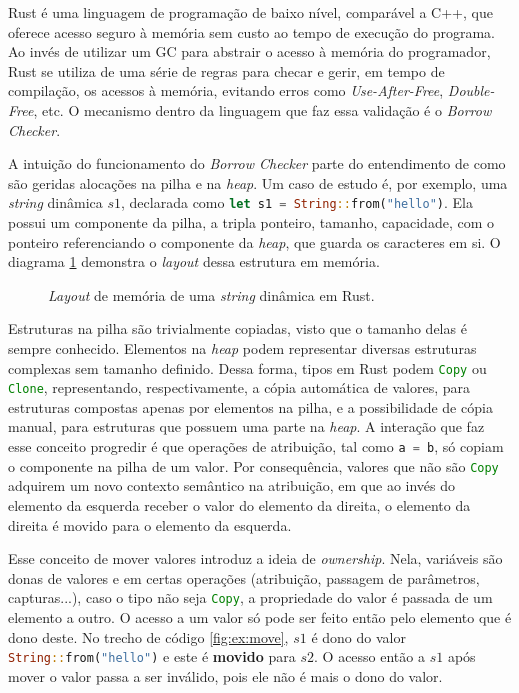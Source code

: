 Rust é uma linguagem de programação de baixo nível, comparável a C++, que oferece acesso seguro à memória sem custo ao tempo de execução do programa. Ao invés de utilizar um GC para abstrair o acesso à memória do programador, Rust se utiliza de uma série de regras para checar e gerir, em tempo de compilação, os acessos à memória, evitando erros como \emph{Use-After-Free}, \emph{Double-Free}, etc. O mecanismo dentro da linguagem que faz essa validação é o \emph{Borrow Checker}. 

A intuição do funcionamento do \emph{Borrow Checker} parte do entendimento de como são geridas alocações na pilha e na \emph{heap}. Um caso de estudo é, por exemplo, uma \emph{string} dinâmica $s1$, declarada como \lstinline[language=Rust]|let s1 = String::from("hello")|. Ela possui um componente da pilha, a tripla ponteiro, tamanho, capacidade, com o ponteiro referenciando o componente da \emph{heap}, que guarda os caracteres em si. O diagrama \ref{fig:svg:mem-layout} demonstra o \emph{layout} dessa estrutura em memória.

\begin{figure}[ht]
	\centering
	\caption{\emph{Layout} de memória de uma \emph{string} dinâmica em Rust.}
	\label{fig:svg:mem-layout}
	
\end{figure}

Estruturas na pilha são trivialmente copiadas, visto que o tamanho delas é sempre conhecido. Elementos na \emph{heap} podem representar diversas estruturas complexas sem tamanho definido.  Dessa forma, tipos em Rust podem \lstinline[language=Rust]|Copy| ou \lstinline[language=Rust]|Clone|, representando, respectivamente, a cópia automática de valores, para estruturas compostas apenas por elementos na pilha, e a possibilidade de cópia manual, para estruturas que possuem uma parte na \emph{heap}. A interação que faz esse conceito progredir é que operações de atribuição, tal como \lstinline[language=Rust]|a = b|, só copiam o componente na pilha de um valor. Por consequência, valores que não são \lstinline[language=Rust]|Copy| adquirem um novo contexto semântico na atribuição, em que ao invés do elemento da esquerda receber o valor do elemento da direita, o elemento da direita é movido para o elemento da esquerda. 

Esse conceito de mover valores introduz a ideia de \emph{ownership}. Nela, variáveis são donas de valores e em certas operações (atribuição, passagem de parâmetros, capturas...), caso o tipo não seja \lstinline[language=Rust]|Copy|, a propriedade do valor é passada de um elemento a outro. O acesso a um valor só pode ser feito então pelo elemento que é dono deste. No trecho de código \ref{fig:ex:move}, $s1$ é dono do valor \lstinline[language=Rust]|String::from("hello")| e este é \textbf{movido} para $s2$. O acesso então a $s1$ após mover o valor passa a ser inválido, pois ele não é mais o dono do valor.

